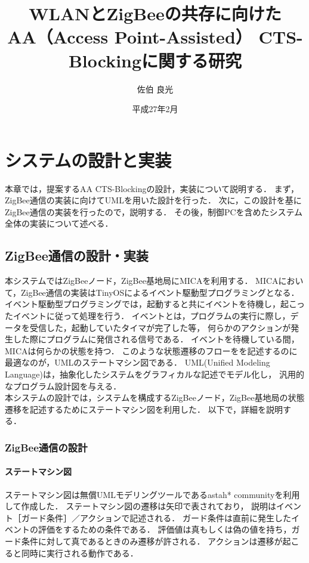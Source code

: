 \documentclass[12pt]{jreport}
\date{平成27年2月}
\title{\fontsize{15.5pt}{25pt}\selectfont WLANとZigBeeの共存に向けた\\AA（Access Point-Assisted） CTS-Blockingに関する研究}
\author{佐伯 良光}
\begin{document}
\maketitle


\chapter{システムの設計と実装}\label{implement}%

本章では，提案するAA CTS-Blockingの設計，実装について説明する．
まず，ZigBee通信の実装に向けてUMLを用いた設計を行った．
次に，この設計を基にZigBee通信の実装を行ったので，説明する．
その後，制御PCを含めたシステム全体の実装について述べる．\\

\section{ZigBee通信の設計・実装}

本システムではZigBeeノード，ZigBee基地局にMICAを利用する．
MICAにおいて，ZigBee通信の実装はTinyOSによるイベント駆動型プログラミングとなる．
イベント駆動型プログラミングでは，起動すると共にイベントを待機し，起こったイベントに従って処理を行う．
イベントとは，プログラムの実行に際し，データを受信した，起動していたタイマが完了した等，
何らかのアクションが発生した際にプログラムに発信される信号である．
イベントを待機している間，MICAは何らかの状態を持つ．
このような状態遷移のフローをを記述するのに最適なのが，UMLのステートマシン図である．
UML(Unified Modeling Language)は，抽象化したシステムをグラフィカルな記述でモデル化し，
汎用的なプログラム設計図を与える．\\
本システムの設計では，システムを構成するZigBeeノード，ZigBee基地局の状態遷移を記述するためにステートマシン図を利用した．
以下で，詳細を説明する．

\subsection{ZigBee通信の設計}

\subsubsection{ステートマシン図}

ステートマシン図は無償UMLモデリングツールであるastah* communityを利用して作成した．
ステートマシン図の遷移は矢印で表されており，
説明はイベント［ガード条件］／アクションで記述される．
ガード条件は直前に発生したイベントの評価をするための条件である．
評価値は真もしくは偽の値を持ち，ガード条件に対して真であるときのみ遷移が許される．
アクションは遷移が起こると同時に実行される動作である．
\end{document}
